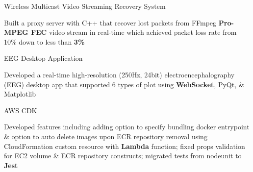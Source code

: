 

\begin{cventries}

  \cventry
    {} %
    {Wireless Multicast Video Streaming Recovery System} %
    {} %
    {} %
    {
      \vspace{-2em}
      \begin{cvitems} %
        \item {Built a proxy server with C++ that recover lost packets from FFmpeg \textbf{Pro-MPEG FEC} video stream in real-time which achieved packet loss rate from 10\% down to less than \textbf{3\%}}
      \end{cvitems}
    }

  \cventry
    {} %
    {EEG Desktop Application} %
    {} %
    {} %
    {
      \vspace{-4em}
      \begin{cvitems} %
        \item {Developed a real-time high-resolution (250Hz, 24bit) electroencephalography (EEG) desktop app that supported 6 types of plot using \textbf{WebSocket}, PyQt, \& Matplotlib}
      \end{cvitems}
    }

  \cventry
    {} %
    {AWS CDK} %
    {} %
    {} %
    {
      \vspace{-1.5em}
      \begin{cvitems} %
        \item {Developed features including adding option to specify bundling docker entrypoint \& option to auto delete images upon ECR repository removal using CloudFormation custom resource with \textbf{Lambda} function; fixed props validation for EC2 volume \& ECR repository constructs; migrated tests from nodeunit to \textbf{Jest}}
      \end{cvitems}
    }


\end{cventries}
